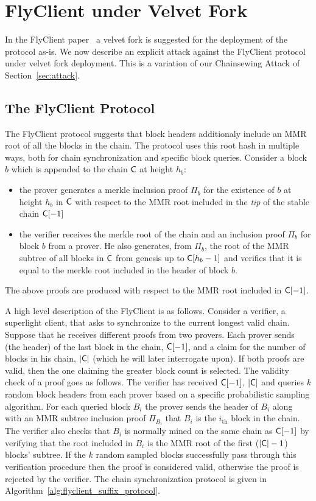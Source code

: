 \section{FlyClient under Velvet Fork}
\label{sec:flyclient}
In the FlyClient paper~\cite{flyclient} a velvet fork is suggested for the deployment of the protocol as-is.
We now describe an explicit attack against
the FlyClient protocol under velvet fork deployment.
This is a variation of our Chainsewing Attack of Section~\ref{sec:attack}.

\subsection{The FlyClient Protocol}
	The FlyClient protocol suggests that block headers additionaly include an MMR root of all the blocks in the chain. The protocol uses this root hash in multiple ways, both for chain synchronization and specific block queries. Consider a block $b$ which is appended to the chain $\mathsf{C}$ at height $h_b$:
	\begin{itemize}
		\item the prover generates a merkle inclusion proof $\Pi_b$ for the existence of $b$ at height $h_b$ in $\mathsf{C}$ with respect to the MMR root included in the \emph{tip} of the stable chain $\mathsf{C}[-1]$
		\item the verifier receives the merkle root of the chain and an inclusion proof $\Pi_b$ for block $b$ from a prover. He also generates, from $\Pi_b$, the root of the MMR subtree of all blocks in $\mathsf{C}$ from genesis up to $\mathsf{C}[h_b - 1]$ and verifies that it is equal to the merkle root included in the header of block $b$.
	\end{itemize}
	The above proofs are produced with respect to the MMR root included in $\mathsf{C}[-1]$.

	\vspace{2mm}
	\noindent
	A high level description of the FlyClient is as follows. Consider a verifier, a superlight client, that asks to synchronize to the current longest valid chain. Suppose that he receives different proofs from two provers. Each prover sends (the header) of the last block in the chain, $\mathsf{C}[-1]$, and a claim for the number of blocks in his chain, $\lvert \mathsf{C} \rvert$ (which he will later interrogate upon). If both proofs are valid, then the one claiming the greater block count is selected. The validity check of a proof goes as follows.
	The verifier has received $\mathsf{C}[-1]$, $\lvert \mathsf{C} \rvert$ and queries $k$ random block headers from each prover based on a specific probabilistic sampling algorithm. For each queried block $B_i$ the prover sends the header of $B_i$ along with an MMR subtree inclusion proof $\Pi_{B_i}$ that $B_i$ is the $i_\text{th}$ block in the chain. The verifier also checks that $B_i$ is normally mined on the same chain as $\mathsf{C}[-1]$ by verifying that the root included in $B_i$ is the MMR root of the first ($\lvert \mathsf{C} \rvert - 1$) blocks' subtree. If the $k$ random sampled blocks successfully pass through this verification procedure then the proof is considered valid, otherwise the proof is rejected by the verifier.
	The chain synchronization protocol is given in Algorithm~\ref{alg:flyclient_suffix_protocol}.

